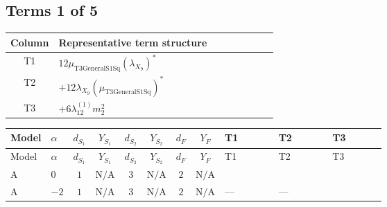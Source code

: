 \documentclass[8pt]{article}
\begin{document}
\begin{landscape}
\subsection*{Terms 1 of 5}
\begin{center}
\begin{tabular}{@{}c >{\raggedright\arraybackslash}p{0.82\linewidth}@{}}
\toprule
Column & Representative term structure \\
\midrule
T1 & \(\displaystyle 12 {\mu_{\mathrm{T3GeneralS1Sq}}} \left({\lambda_{X_{9}}}\right)^{*}\) \\
\midrule
T2 & \(\displaystyle +12 {\lambda_{X_{9}}} \left({\mu_{\mathrm{T3GeneralS1Sq}}}\right)^{*}\) \\
\midrule
T3 & \(\displaystyle +6 {\lambda_{12}^{(1)}} {m_2^2}\) \\
\midrule
\bottomrule
\end{tabular}
\end{center}
\smallskip
\tiny
\begin{longtable}{@{}llcccccc >{\raggedright\arraybackslash}p{0.21\linewidth} >{\raggedright\arraybackslash}p{0.21\linewidth} >{\raggedright\arraybackslash}p{0.21\linewidth}@{}}
\toprule
Model & $\alpha$ & $d_{S_1}$ & $Y_{S_1}$ & $d_{S_2}$ & $Y_{S_2}$ & $d_F$ & $Y_F$ & T1 & T2 & T3 \\
\midrule
\endfirsthead
\toprule
Model & $\alpha$ & $d_{S_1}$ & $Y_{S_1}$ & $d_{S_2}$ & $Y_{S_2}$ & $d_F$ & $Y_F$ & T1 & T2 & T3 \\
\midrule
\endhead
A & $0$ & $1$ & $\text{N/A}$ & $3$ & $\text{N/A}$ & $2$ & $\text{N/A}$ & \scriptsize\adjustbox{max width=\linewidth}{$\begin{gathered} 12 {\mu_{\mathrm{T3GeneralS1Sq}}} \left({\lambda_{X_{9}}}\right)^{*}\end{gathered}$} & \scriptsize\adjustbox{max width=\linewidth}{$\begin{gathered} +12 {\lambda_{X_{9}}} \left({\mu_{\mathrm{T3GeneralS1Sq}}}\right)^{*}\end{gathered}$} & \scriptsize\adjustbox{max width=\linewidth}{$\begin{gathered} +6 {\lambda_{12}^{(1)}} {m_2^2}\end{gathered}$} \\
\midrule
A & $-2$ & $1$ & $\text{N/A}$ & $3$ & $\text{N/A}$ & $2$ & $\text{N/A}$ & --- & --- & \scriptsize\adjustbox{max width=\linewidth}{$\begin{gathered} +6 {\lambda_{12}^{(1)}} {m_2^2}\end{gathered}$} \\

\end{longtable}
\end{landscape}
\end{document}
